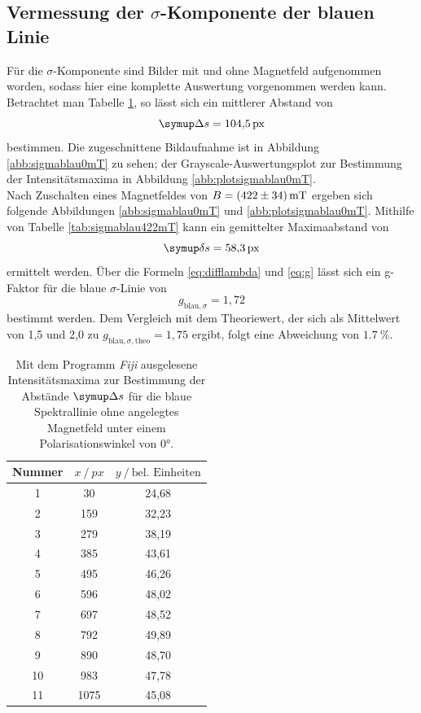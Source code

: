 \subsection{Vermessung der \texorpdfstring{$\sigma$}{sigma}-Komponente der blauen Linie}
Für die $\sigma$-Komponente sind Bilder mit und ohne Magnetfeld aufgenommen worden, sodass hier eine komplette Auswertung vorgenommen werden kann. Betrachtet man Tabelle \ref{tab:sigmablau0mT}, so lässt sich ein mittlerer Abstand von
\begin{equation}
  \Deltaup s=\SI{104,5}{px}
\end{equation}
bestimmen. Die zugeschnittene Bildaufnahme ist in Abbildung \ref{abb:sigmablau0mT} zu sehen; der Grayscale-Auswertungsplot zur Bestimmung der Intensitätsmaxima in Abbildung \ref{abb:plotsigmablau0mT}.\\
Nach Zuschalten eines Magnetfeldes von $B=\SI{422\pm34}{\milli\tesla}$ ergeben sich folgende Abbildungen \ref{abb:sigmablau0mT} und \ref{abb:plotsigmablau0mT}. Mithilfe von Tabelle \ref{tab:sigmablau422mT} kann ein gemittelter Maximaabstand von
\begin{equation}
\deltaup s=\SI{58,3}{px}
\end{equation}
ermittelt werden.
Über die Formeln \eqref{eq:difflambda} und \eqref{eq:g} lässt sich ein g-Faktor für die blaue $\sigma$-Linie von
\begin{equation}
 g_{\text{blau},\sigma}=1{,}72
\end{equation}
bestimmt werden. Dem Vergleich mit dem Theoriewert, der sich als Mittelwert von 1,5 und 2,0 zu $g_{\text{blau},\sigma,\text{theo}}=1{,}75$ ergibt, folgt eine Abweichung von $\SI{1,7}{\%}$.

\begin{table}[H]
  \centering
  \caption{Mit dem Programm \textit{Fiji} \cite{Fiji} ausgelesene Intensitätsmaxima zur Bestimmung der Abstände $\Deltaup s$ für die blaue Spektrallinie ohne angelegtes Magnetfeld unter einem Polarisationswinkel von $0°$.}
  \label{tab:sigmablau0mT}
  \begin{tabular}{c|cc}
    \toprule
    {Nummer} & {$x \:/\: \si{px}$} & {$y \:/\: \text{bel. Einheiten}$}\\
    \midrule
 1 &   30  &	 24,68 \\
 2 &   159  &	 32,23 \\
 3 &  279  &	 38,19 \\
 4 &  385  &	 43,61 \\
 5 &  495  &	 46,26 \\
 6 &  596  &	 48,02 \\
 7 &  697  &	 48,52 \\
 8 &  792  &	 49,89 \\
 9 &  890  &   48,70 \\
10 &  983  &	 47,78 \\
11 &  1075  &	 45,08 \\
  \end{tabular}
\end{table}

